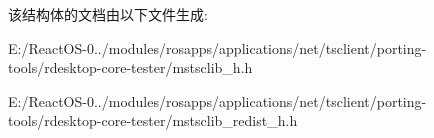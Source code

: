 该结构体的文档由以下文件生成\+:\begin{DoxyCompactItemize}
\item 
E\+:/\+React\+O\+S-\/0../modules/rosapps/applications/net/tsclient/porting-\/tools/rdesktop-\/core-\/tester/mstsclib\+\_\+h.\+h\item 
E\+:/\+React\+O\+S-\/0../modules/rosapps/applications/net/tsclient/porting-\/tools/rdesktop-\/core-\/tester/mstsclib\+\_\+redist\+\_\+h.\+h\end{DoxyCompactItemize}

